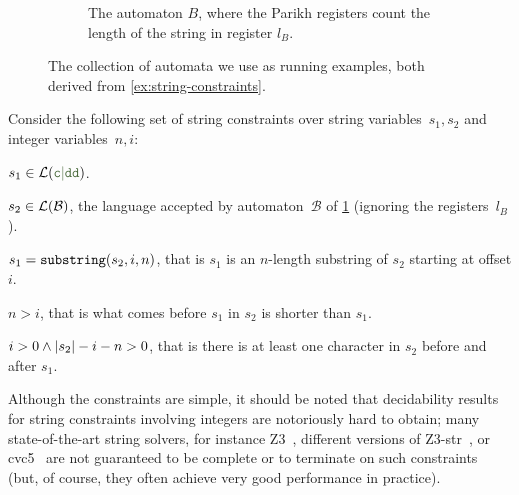 \begin{figure}[ht]
\begin{subfigure}[b]{\autscale\textwidth}
    \caption{The automaton $B$, where the Parikh registers count the length of
    the string in register $l_B$.}\label{fig:aut_b}
  \end{subfigure}
  \caption{The collection of automata we use as running
  examples, both derived from \cref{ex:string-constraints}.}\label{fig:examples}
\end{figure}


\begin{example}\label{ex:string-constraints} Consider the following set of
    string constraints over string variables~$s_1, s_2$ and integer
    variables~$n, i$:
\begin{constraints}
    \item\label{const:s1-in-c-dd} $s_1 \in \Language(\Regex{c\RegexOr{}dd})$.
    \item\label{const:s2-in-b} $s_2 \in \operatorname{\mathcal{L}}(\mathcal{B})$, the language accepted by
    automaton~$\mathcal{B}$ of \cref{fig:aut_b} (ignoring
    the registers~$l_B$).
    \item\label{const:s1-substring} $s_1 = \operatorname{\mathtt{substring}}(s_2, i, n)$, that is $s_1$ is an
    $n$-length substring of $s_2$ starting at offset $i$.
    \item\label{const:more-inside-than-before} $n > i$, that is what comes
    before $s_1$ in $s_2$ is shorter than $s_1$.
    \item\label{const:something-before-and-after} $i > 0 \land |s_2| -i -n > 0$, that
    is there is at least one character in $s_2$ before and after $s_1$.
\end{constraints}
\end{example}

Although the constraints are simple, it should be noted that
decidability results for string constraints involving integers are
notoriously hard to obtain; many state-of-the-art string solvers, for
instance Z3~\cite{Z3}, different versions of
Z3-str~\cite{Z3-str,DBLP:conf/fm/MoraBKNG21}, or
cvc5~\cite{cvc5}
are not guaranteed to be complete or to terminate on such constraints
(but, of course, they often achieve very good performance in practice).

